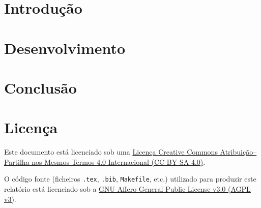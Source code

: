 \documentclass[12pt,a4paper,openright,oneside]{memoir}
\begin{document}

\clearpage
{}

\chapter{Introdução}
\label{ch:intro}

\chapter{Desenvolvimento}
\label{ch:dev}

\chapter{Conclusão}
\label{ch:conclusion}

\clearpage
\printbibliography[title={Referências Bibliográficas}]

\clearpage
\chapter*{Licença}
\noindent
Este documento está licenciado sob uma
\href{https://creativecommons.org/licenses/by-sa/4.0/}{Licença Creative Commons Atribuição–Partilha nos Mesmos Termos 4.0 Internacional (CC BY-SA 4.0)}.

\vspace{0.5cm}
O código fonte (ficheiros \texttt{.tex}, \texttt{.bib}, \texttt{Makefile}, etc.) utilizado para produzir este relatório está licenciado sob a
\href{https://www.gnu.org/licenses/agpl-3.0.html}{GNU Affero General Public License v3.0 (AGPL v3)}.

\clearpage
\appendix


\backmatter
\end{document}
